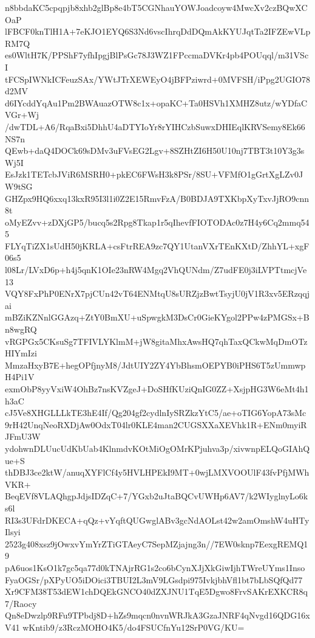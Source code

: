n8bbdaKC5cpqpjb8xhb2glBp8e4bT5CGNhauYOWJoadcoyw4MwcXv2czBQwXCOaP
lFBCF0knTlH1A+7eKJO1EYQ6S3Nd6vscIhrqDdDQmAkKYUJqtTa2IFZEwVLpRM7Q
es0WltH7K/PPShF7yfhIpgjBlPsGc78J3WZ1FPccmaDVKr4pb4POUqql/m31VScI
tFCSpIWNkICFeuzSAx/YWtJTrXEWEyO4jBFPziwrd+0MVFSH/iPpg2UGIO78d2MV
d6IYcddYqAu1Pm2BWAuazOTW8c1x+opaKC+Ta0HSVh1XMHZ8utz/wYDfaCVGr+Wj
/dwTDL+A6/RqaBxi5DhhU4aDTYIoYr8rYIHCzbSuwxDHIEqlKRVSemy8Ek66NS7n
QEwb+daQ4DOCk69sDMv3uFVsEG2Lgv+8SZHtZI6H50U10nj7TBT3t10Y3g3sWj5I
EsJzk1TETcbJViR6MSRH0+pkEC6FWsH3k8PSr/8SU+VFMfO1gGrtXgLZv0JW9tSG
GHZpx9HQ6xxq13kxR95I3l1i0Z2E15RmvFzA/B0BDJA9TXKbpXyTxvJjRO9cnn8t
oMyEZvv+zDXjGP5/bucq5s2Rpg8Tkap1r5qIhevfFIOTODAc0z7H4y6Cq2mmq545
FLYqTiZX1sUdH50jKRLA+csFtrREA9zc7QY1UtanVXrTEnKXtD/ZhhYL+xgF06s5
l08Lr/LVxD6p+h4j5qnK1OIe23nRW4Mgq2VhQUNdm/Z7udFE0j3iLVPTtmcjVe13
VQY8FxPhP0ENrX7pjCUn42vT64ENMtqU8sURZjzBwtTsyjU0jV1R3xv5ERzqqjai
mBZiKZNnlGGAzq+ZtY0BmXU+uSpwgkM3DsCr0GieKYgol2PPw4zPMGSx+Bn8wgRQ
vRGPGx5CKsuSg7TFIVLYKlmM+jW8gitaMhxAwsHQ7qhTaxQCkwMqDmOTzHIYmIzi
MmzaHxyB7E+hegOPfjnyM8/JdtUIY2ZY4YbBhsmOEPYB0iPHS6T5zUmmwpH4Pi1V
exmObP8yyVxiW4OhBz7nsKVZgeJ+DoSHfKUziQnIG0ZZ+XsjpHG3W6eMt4h1h3aC
cJ5Ve8XHGLLLkTE3hE4If/Qg204gf2cydlnIySRZkzYtC5/ae+oTIG6YopA73sMc
9rH42UnqNeoRXDjAw0OdxT04lr0KLE4man2CUGSXXaXEVhk1R+ENm0myiRJFmU3W
ydohwnDLUucUdKbUab4KlnmdvKOtMiOgOMrKPjuhva3p/xivwnpELQoGIAhQue+S
thDBJ3ce2ktW/anuqXYFlCf4y5HVLHPEkI9MT+0wjLMXVOOUlF43fvPfjMWhVKR+
BeqEVf8VLAQhgpJdjsIDZqC+7/YGxb2uJtaBQCvUWHp6AV7/k2WIyglnyLo6ks6l
RI3s3UFdrDKECA+qQz+vYqftQUGwglABv3gcNdAOLst42w2amOmshW4uHTyIlsyi
2523g408xsz9jOwxvYmYrZTiGTAeyC7SepMZjajng3n//7EW0sknp7EexgREMQ19
pA6uos1KsO1k7gc5qa77d0kTNAjrRG1s2co6bCynXJjXkGiwIjhTWreUYms1Inso
FyaOGSr/pXPyUO5iDOici3TBUI2L3mV9LGsdpi975IvkjbhVfl1bt7bLbSQfQd77
Xr9CFM38T53dEW1chDQEkGNCO40dZXJNU1TqE5Dgwo8FrvSAKrEXKCR8q7/Raocy
Qn8eDwzlp9RFu9TPbdj8D+hZs9mqcn0nvnWRJkA3GzaJNRF4qNvgd16QDG16xV41
wKntib9/z3RczMOHO4K5/do4FSUCfnYu12SrP0VG/KU=

